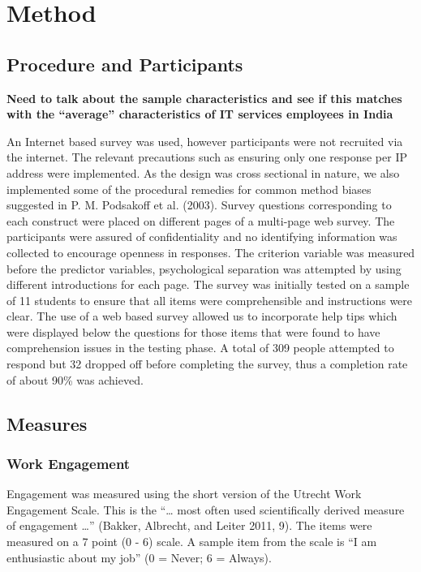 \section{Method}\label{method}

\subsection{Procedure and
Participants}\label{procedure-and-participants}

\textbf{Need to talk about the sample characteristics and see if this
matches with the ``average'' characteristics of IT services employees in
India}

An Internet based survey was used, however participants were not
recruited via the internet. The relevant precautions such as ensuring
only one response per IP address were implemented. As the design was
cross sectional in nature, we also implemented some of the procedural
remedies for common method biases suggested in P. M. Podsakoff et al.
(2003). Survey questions corresponding to each construct were placed on
different pages of a multi-page web survey. The participants were
assured of confidentiality and no identifying information was collected
to encourage openness in responses. The criterion variable was measured
before the predictor variables, psychological separation was attempted
by using different introductions for each page. The survey was initially
tested on a sample of 11 students to ensure that all items were
comprehensible and instructions were clear. The use of a web based
survey allowed us to incorporate help tips which were displayed below
the questions for those items that were found to have comprehension
issues in the testing phase. A total of 309 people attempted to respond
but 32 dropped off before completing the survey, thus a completion rate
of about 90\% was achieved.

\subsection{Measures}\label{measures}

\subsubsection{Work Engagement}\label{work-engagement}

Engagement was measured using the short version of the Utrecht Work
Engagement Scale. This is the ``\ldots{} most often used scientifically
derived measure of engagement \ldots{}'' (Bakker, Albrecht, and Leiter
2011, 9). The items were measured on a 7 point (0 - 6) scale. A sample
item from the scale is ``I am enthusiastic about my job'' (0 = Never; 6
= Always).

